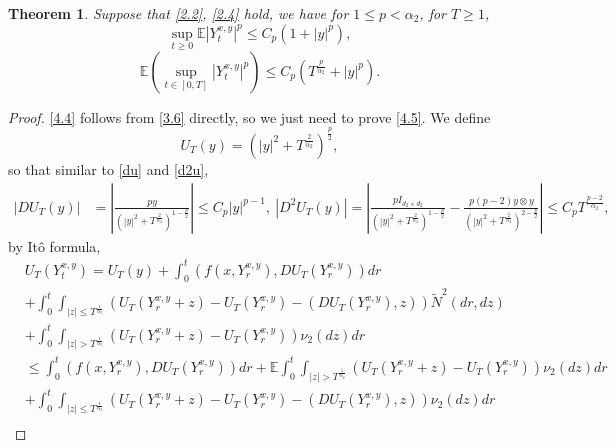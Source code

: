 \documentclass[11pt,reqno]{amsart}
\newtheorem{theorem}{\indent Theorem}[section]
\numberwithin{equation}{section}
\begin{document}
\begin{theorem}\label{T41}
	Suppose that \eqref{2.2}, \eqref{2.4} hold, we have for $1\leq p<\alpha_{2}$, for $T\geq 1$,
	\begin{equation}\label{4.4}
	\sup_{t\geq0} \mathbb{E}|Y_{t}^{ x,y}|^{p}\leq C_{p}(1+|y|^{p}),
	\end{equation}
	\begin{equation}\label{4.5}
		\mathbb{E}\left(\sup_{t\in [0,T]} |Y_{t}^{ x,y}|^{p}\right)\leq C_{p}(T^{\frac{p}{\alpha_{2}}}+|y|^{p}).
	\end{equation}
\end{theorem}
\begin{proof}
	\eqref{4.4} follows from \eqref{3.6} directly, so we just need to prove \eqref{4.5}.
	We define 
	\begin{equation}\label{4.6}
		U_{T}(y)=(|y|^{2}+T^{\frac{2}{\alpha_{2}}})^{\frac{p}{2}},
	\end{equation}
	so that similar to \eqref{du} and \eqref{d2u},
	\begin{equation}\label{4.7}
		\begin{split}
				|DU_{T}(y)|&=\left|  \frac{py}{(|y|^{2}+T^{\frac{2}{\alpha_{2}}})^{1-\frac{p}{2}}}\right|\leq C_{p} |y|^{p-1},\
		|D^{2}U_{T}(y)|=\left|   \frac{pI_{d_{2}\times d_{2} }}{(|y|^{2}+T^{\frac{2}{\alpha_{2}}})^{1-\frac{p}{2}}}-\frac{p(p-2)y\otimes y}{(|y|^{2}+T^{\frac{2}{\alpha_{2}}})^{2-\frac{p}{2}}} \right|\leq C_{p}T^{\frac{p-2}{\alpha_{2}}},
		\end{split}
	\end{equation}
by It\^{o} formula,
	\begin{equation}\label{4.8}
		\begin{split}
			&U_{T}(Y_{t}^{ x,y})=U_{T}(y)+ \int_{0}^{t} (f(x,Y_{r}^{ x,y}),DU_{T}(Y_{r}^{x,y})) dr \\
			&+ \int_{0}^{t}\int_{|z|\leq T^{\frac{1}{\alpha_{2}}}}\left( U_{T}(Y_{r}^{ x,y}+z)-U_{T}(Y_{r}^{ x,y})-(DU_{T}(Y_{r}^{ x,y}), z)  \right) \tilde{N}^{2}(dr,dz)\\
			&+\int_{0}^{t} \int_{|z|> T^{\frac{1}{\alpha_{2}}}}\left( U_{T}(Y_{r}^{x,y}+z)-U_{T}(Y_{r}^{ x,y}) \right) \nu_{2}(dz)dr\\
			&\leq  \int_{0}^{t} (f(x,Y_{r}^{x,y}),DU_{T}(Y_{r}^{ x,y})) dr+\mathbb{E} \int_{0}^{t}\int_{|z|> T^{\frac{1}{\alpha_{2}}}}\left( U_{T}(Y_{r}^{x,y}+z)-U_{T}(Y_{r}^{ x,y}) \right) \nu_{2}(dz)dr\\
			&+\int_{0}^{t} \int_{|z|\leq T^{\frac{1}{\alpha_{2}}}}\left( U_{T}(Y_{r}^{x,y}+z)-U_{T}(Y_{r}^{ x,y})- (DU_{T}(Y_{r}^{x,y}), z)\right) \nu_{2}(dz)dr\\

\end{split}
\end{equation}
\end{proof}
\end{document}

